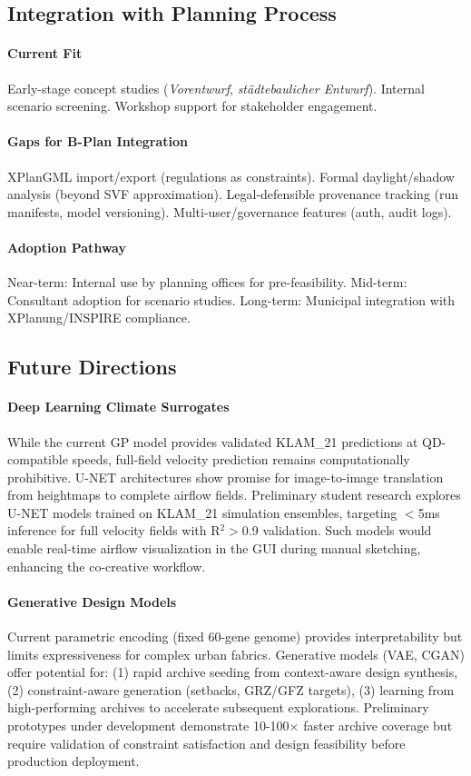 \documentclass[times,final]{elsarticle}
\begin{document}
\subsection{Integration with Planning Process}

\paragraph{Current Fit}
Early-stage concept studies (\textit{Vorentwurf}, \textit{städtebaulicher Entwurf}). Internal scenario screening. Workshop support for stakeholder engagement.

\paragraph{Gaps for B-Plan Integration}
XPlanGML import/export (regulations as constraints). Formal daylight/shadow analysis (beyond SVF approximation). Legal-defensible provenance tracking (run manifests, model versioning). Multi-user/governance features (auth, audit logs).

\paragraph{Adoption Pathway}
Near-term: Internal use by planning offices for pre-feasibility. Mid-term: Consultant adoption for scenario studies. Long-term: Municipal integration with XPlanung/INSPIRE compliance.

\subsection{Future Directions}

\paragraph{Deep Learning Climate Surrogates}
While the current GP model provides validated KLAM\_21 predictions at QD-compatible speeds, full-field velocity prediction remains computationally prohibitive. U-NET architectures show promise for image-to-image translation from heightmaps to complete airflow fields. Preliminary student research explores U-NET models trained on KLAM\_21 simulation ensembles, targeting $<$5ms inference for full velocity fields with R$^2>$0.9 validation. Such models would enable real-time airflow visualization in the GUI during manual sketching, enhancing the co-creative workflow.

\paragraph{Generative Design Models}
Current parametric encoding (fixed 60-gene genome) provides interpretability but limits expressiveness for complex urban fabrics. Generative models (VAE, CGAN) offer potential for: (1) rapid archive seeding from context-aware design synthesis, (2) constraint-aware generation (setbacks, GRZ/GFZ targets), (3) learning from high-performing archives to accelerate subsequent explorations. Preliminary prototypes under development demonstrate 10-100$\times$ faster archive coverage but require validation of constraint satisfaction and design feasibility before production deployment.
\end{document}
